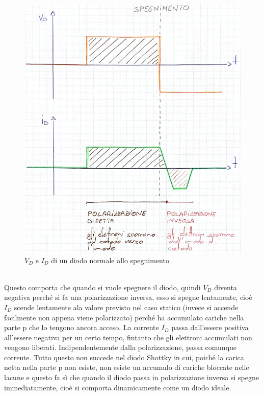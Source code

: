 \documentclass[12pt, a4paper]{report}
\begin{document}
\begin{description}
    \begin{figure}[ht]
        \centering
        \includegraphics[scale=0.45,angle=0]{diodo_spegnimento.png}
        \caption{$V_{D}$ e $I_{D}$ di un diodo normale allo spegnimento}
    \end{figure}
    \\Questo comporta che quando si vuole spegnere il diodo, quindi $V_{D}$ diventa negativa perché si fa una polarizzazione inversa, esso si spegne lentamente, cioè $I_{D}$ scende lentamente ala valore previsto nel caso statico (invece si accende facilmente non appena viene polarizzato) perché ha accumulato cariche nella parte p che lo tengono ancora acceso. La corrente $I_{D}$ passa dall'essere positiva all'essere negativa per un certo tempo, fintanto che gli elettroni accumulati non vengono liberati. Indipendentemente dalla polarizzazione, passa comunque corrente. Tutto questo non succede nel diodo Shottky in cui, poiché la carica netta nella parte p non esiste, non esiste un accumulo di cariche bloccate nelle lacune e questo fa sì che quando il diodo passa in polarizzazione inversa si spegne immediatamente, cioè si comporta dinamicamente come un diodo ideale.
\end{description}
\end{document}
